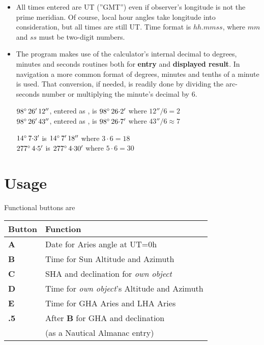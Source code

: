 \documentclass[swedish,a4paper,onepage, 11pt]{scrbook}
\begin{document}
\begin{itemize}
\item All times entered are UT (''GMT'') even if observer's longitude is not the prime meridian. Of course, local hour angles take longitude into consideration, but all times are still UT. Time format is $hh.mmss$, where $mm$ and $ss$ must be two-digit numbers.


\item The program makes use of the calculator's internal decimal to degrees, minutes and seconds routines both for \textbf{entry} and \textbf{displayed result}. In navigation a more common format of degrees, minutes and tenths of a minute is used. That conversion, if needed, is readily done by dividing the arc-seconds number or multiplying the minute's decimal by 6.


 $98\degree\, 26'\, 12''$, entered as ,  is $98\degree\, 26{\cdot}2'$ where $12''/6=2$\\
 $98\degree\, 26'\, 43''$, entered as , is $98\degree\, 26{\cdot}7'$ where $43''/6\approx7$
 \slutex
 

 $14\degree\, 7{\cdot}3'$  is $14\degree\, 7'\, 18''$ where $3 \cdot 6=18$\\
 $277\degree\, 4{\cdot}5'$  is $277\degree\, 4{\cdot}30'$ where $5 \cdot 6=30$
 \slutex
 
\end{itemize}
 
\section*{Usage} 

Functional buttons are 

\begin{center}
\begin{tabular}{ll}
Button & Function \\
\hline
\textbf{\textsf{A}} & Date for Aries angle at UT=0h\\
\textbf{\textsf{B}} & Time for Sun Altitude and Azimuth \\
\textbf{\textsf{C}} & SHA and declination for \emph{own object} \\
\textbf{\textsf{D}} & Time for \emph{own object}'s Altitude and Azimuth \\
\textbf{\textsf{E}} & Time for GHA Aries and LHA Aries\\
\textbf{\textsf{.5}} & After \textbf{\textsf{B}} for GHA and declination\\
& (as a Nautical Almanac entry)\\
\end{tabular}
\end{center}
\end{document}
